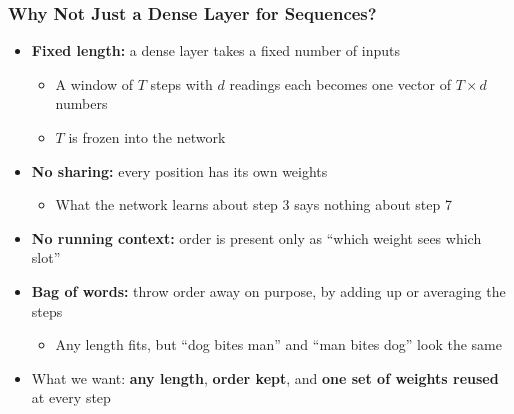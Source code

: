\begin{frame}[fragile] \frametitle{Why Not Just a Dense Layer for Sequences?}
\begin{itemize}
\item \textbf{Fixed length:} a dense layer takes a fixed number of inputs
  \begin{itemize}
  \item A window of $T$ steps with $d$ readings each becomes one vector of $T \times d$ numbers
  \item $T$ is frozen into the network
  \end{itemize}
\item \textbf{No sharing:} every position has its own weights
  \begin{itemize}
  \item What the network learns about step 3 says nothing about step 7
  \end{itemize}
\item \textbf{No running context:} order is present only as ``which weight sees which slot''
\item \textbf{Bag of words:} throw order away on purpose, by adding up or averaging the steps
  \begin{itemize}
  \item Any length fits, but ``dog bites man'' and ``man bites dog'' look the same
  \end{itemize}
\item What we want: \textbf{any length}, \textbf{order kept}, and \textbf{one set of weights reused} at every step
\end{itemize}
\end{frame}

